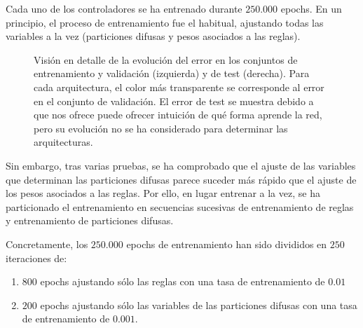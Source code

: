 Cada uno de los controladores se ha entrenado durante $250.000$ epochs. En un principio, el proceso de entrenamiento fue el habitual, ajustando todas las variables a la vez (particiones difusas y pesos asociados a las reglas).

\begin{figure}[!b]
	\centering
	\qquad
	\caption[Evolución del error durante el entrenamiento en las arquitecturas de \acrshort{fcs} para el modelo longitudinal]{Visión en detalle de la evolución del error en los conjuntos de entrenamiento y validación (izquierda) y de test (derecha). Para cada arquitectura, el color más transparente se corresponde al error en el conjunto de validación. El error de test se muestra debido a que nos ofrece puede ofrecer intuición de qué forma aprende la red, pero su evolución no se ha considerado para determinar las arquitecturas.}
	\label{fig:lm-fcs-rmse-all-comparisons}
\end{figure}

Sin embargo, tras varias pruebas, se ha comprobado que el ajuste de las variables que determinan las particiones difusas parece suceder más rápido que el ajuste de los pesos asociados a las reglas. Por ello, en lugar entrenar a la vez, se ha particionado el entrenamiento en secuencias sucesivas de entrenamiento de reglas y entrenamiento de particiones difusas.

Concretamente, los $250.000$ epochs de entrenamiento han sido divididos en $250$ iteraciones de:

\begin{enumerate}
	\item $800$ epochs ajustando sólo las reglas con una tasa de entrenamiento de $0.01$
	\item $200$ epochs ajustando sólo las variables de las particiones difusas con una tasa de entrenamiento de $0.001$.
\end{enumerate}

